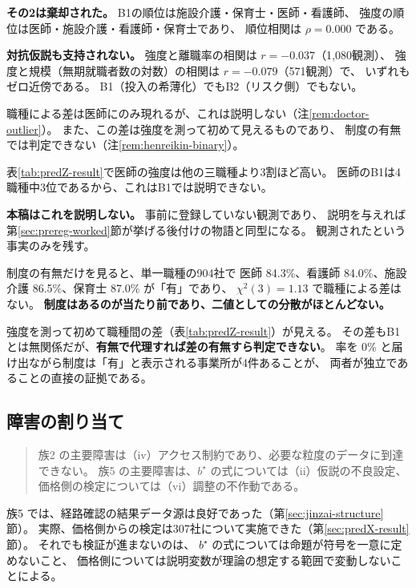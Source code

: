 \textbf{その2は棄却された。} B1の順位は施設介護・保育士・医師・看護師、
強度の順位は医師・施設介護・看護師・保育士であり、
順位相関は $\rho=0.000$ である。

\textbf{対抗仮説も支持されない。} 強度と離職率の相関は $r=-0.037$（1{,}080観測）、
強度と規模（無期就職者数の対数）の相関は $r=-0.079$（571観測）で、
いずれもゼロ近傍である。
B1（投入の希薄化）でもB2（リスク側）でもない。

職種による差は医師にのみ現れるが、これは説明しない（注\ref{rem:doctor-outlier}）。
また、この差は強度を測って初めて見えるものであり、
制度の有無では判定できない（注\ref{rem:henreikin-binary}）。

\begin{remark}[医師だけが突出することの扱い]
\label{rem:doctor-outlier}
表\ref{tab:predZ-result}で医師の強度は他の三職種より3割ほど高い。
医師のB1は4職種中3位であるから、これはB1では説明できない。

\textbf{本稿はこれを説明しない。} 事前に登録していない観測であり、
説明を与えれば第\ref{sec:prereg-worked}節が挙げる後付けの物語と同型になる。
観測されたという事実のみを残す。
\end{remark}

\begin{remark}[有無は強度の代理にならない]
\label{rem:henreikin-binary}
制度の有無だけを見ると、単一職種の904社で
医師 84.3\%、看護師 84.0\%、施設介護 86.5\%、保育士 87.0\% が「有」であり、
$\chi^2(3)=1.13$ で職種による差はない。
\textbf{制度はあるのが当たり前であり、二値としての分散がほとんどない。}

強度を測って初めて職種間の差（表\ref{tab:predZ-result}）が見える。
その差もB1とは無関係だが、\textbf{有無で代理すれば差の有無すら判定できない}。
率を 0\% と届け出ながら制度は「有」と表示される事業所が4件あることが、
両者が独立であることの直接の証拠である。
\end{remark}


\subsection{障害の割り当て}
\label{sec:family-assignment}

\begin{quote}
族2 の主要障害は（iv）アクセス制約であり、必要な粒度のデータに到達できない。
族5 の主要障害は、$b^\star$ の式については（ii）仮説の不良設定、
価格側の検定については（vi）調整の不作動である。
\end{quote}

族5 では、経路確認の結果データ源は良好であった（第\ref{sec:jinzai-structure}節）。
実際、価格側からの検定は307社について実施できた（第\ref{sec:predX-result}節）。
それでも検証が進まないのは、
$b^\star$ の式については命題が符号を一意に定めないこと、
価格側については説明変数が理論の想定する範囲で変動しないことによる。

